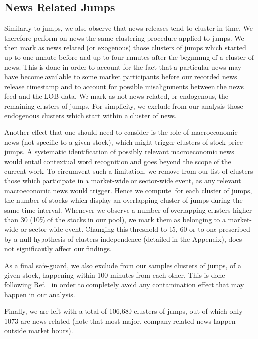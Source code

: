 \documentclass[amsmath,amssymb,aps,pre,floatfix,twocolumn,superscriptaddress]{revtex4}
\begin{document}
\subsection{News Related Jumps} 

Similarly to jumps, we also observe that news releases tend to cluster in time. We therefore perform on news the same clustering procedure applied to jumps. We then mark as news related (or exogenous) those clusters of jumps which started up to one minute before and up to four minutes after the beginning of a cluster of news. This is done in order to account for the fact that a particular news may have become available to some market participants before our recorded news release timestamp and to account for possible misalignments between the news feed and the LOB data. We mark as not news-related, or endogenous, the remaining clusters of jumps. For simplicity, we exclude from our analysis those endogenous clusters which start within a cluster of news. 

Another effect that one should need to consider is the role of macroeconomic news (not specific to a given stock), which might trigger clusters of stock price jumps. A systematic identification of possibly relevant macroeconomic news would entail contextual word recognition and goes beyond the scope of the current work. To circumvent such a limitation, we remove from our list of clusters those which participate in a market-wide or sector-wide event, as any relevant macroeconomic news would trigger. Hence we compute, for each cluster of jumps, the number of stocks which display an overlapping cluster of jumps during the same time interval. Whenever we observe a number of overlapping clusters higher than 30 (10\% of the stocks in our pool), we mark them as belonging to a market-wide or sector-wide event. Changing this threshold to 15, 60 or to one prescribed by a null hypothesis of clusters independence (detailed in the Appendix), does not significantly affect our findings. 

As a final safe-guard, we also exclude from our samples  clusters of jumps, of a given stock, happening within 100 minutes from each other. This is done following Ref.~\cite{boudt2014intraday} in order to completely avoid any contamination effect that may happen in our analysis.  

Finally, we are left with a total of 106,680 clusters of jumps, out of which only 1073 are news related (note that most major, company related news happen outside market hours).
\end{document}
